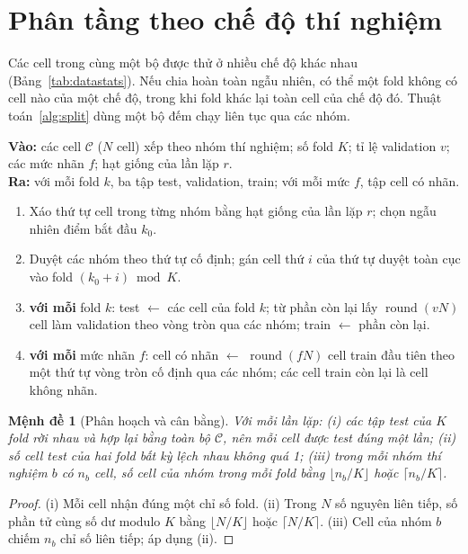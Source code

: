 \documentclass[12pt,a4paper,oneside]{report}
\theoremstyle{plain}
\newtheorem{menhde}{Mệnh đề}[chapter]
\theoremstyle{definition}
\begin{document}
\section{Phân tầng theo chế độ thí nghiệm}

Các cell trong cùng một bộ được thử ở nhiều chế độ khác nhau (Bảng~\ref{tab:datastats}). Nếu chia hoàn toàn ngẫu
nhiên, có thể một fold không có cell nào của một chế độ, trong khi fold khác lại toàn cell của chế độ đó.
Thuật toán~\ref{alg:split} dùng một bộ đếm chạy liên tục qua các nhóm.

\begin{thuattoan}[!htbp]
\caption{Chia kiểm định chéo phân tầng theo nhóm thí nghiệm, cho một lần lặp $r$.}\label{alg:split}
\small
\textbf{Vào:} các cell $\mathcal{C}$ ($N$ cell) xếp theo nhóm thí nghiệm; số fold $K$; tỉ lệ validation $v$; các mức
nhãn $f$; hạt giống của lần lặp $r$.\\
\textbf{Ra:} với mỗi fold $k$, ba tập test, validation, train; với mỗi mức $f$, tập cell có nhãn.
\begin{enumerate}[label=\arabic*:, leftmargin=2.2em, itemsep=1pt, topsep=3pt]
\item Xáo thứ tự cell trong từng nhóm bằng hạt giống của lần lặp $r$; chọn ngẫu nhiên điểm bắt đầu $k_0$.
\item Duyệt các nhóm theo thứ tự cố định; gán cell thứ $i$ của thứ tự duyệt toàn cục vào fold $(k_0 + i) \bmod K$.
\item \textbf{với mỗi} fold $k$: test $\leftarrow$ các cell của fold $k$; từ phần còn lại lấy $\operatorname{round}(vN)$
      cell làm validation theo vòng tròn qua các nhóm; train $\leftarrow$ phần còn lại.
\item \textbf{với mỗi} mức nhãn $f$: cell có nhãn $\leftarrow$ $\operatorname{round}(fN)$ cell train đầu tiên theo một thứ tự
      vòng tròn cố định qua các nhóm; các cell train còn lại là cell không nhãn.
\end{enumerate}
\end{thuattoan}

\begin{menhde}[Phân hoạch và cân bằng]\label{md:partition}
Với mỗi lần lặp: (i) các tập test của $K$ fold rời nhau và hợp lại bằng toàn bộ $\mathcal{C}$, nên mỗi cell
được test đúng một lần; (ii) số cell test của hai fold bất kỳ lệch nhau không quá 1; (iii) trong mỗi nhóm thí
nghiệm $b$ có $n_b$ cell, số cell của nhóm trong mỗi fold bằng $\lfloor n_b/K\rfloor$ hoặc $\lceil n_b/K\rceil$.
\end{menhde}
\begin{proof}
(i) Mỗi cell nhận đúng một chỉ số fold. (ii) Trong $N$ số nguyên liên tiếp, số phần tử cùng số dư modulo $K$ bằng
$\lfloor N/K\rfloor$ hoặc $\lceil N/K\rceil$. (iii) Cell của nhóm $b$ chiếm $n_b$ chỉ số liên tiếp; áp dụng (ii).
\end{proof}
\end{document}
